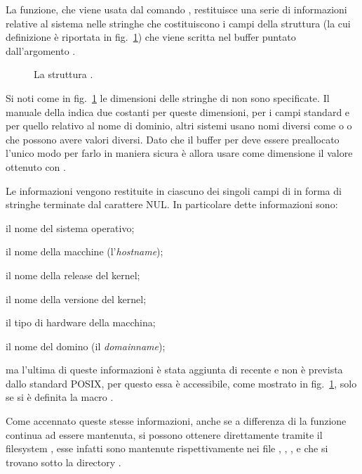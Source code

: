 La funzione, che viene usata dal comando , restituisce una serie di
informazioni relative al sistema nelle stringhe che costituiscono i campi
della struttura  (la cui definizione è riportata in
fig.~\ref{fig:sys_utsname}) che viene scritta nel buffer puntato
dall'argomento .

\begin{figure}[!ht!b]
  \footnotesize \centering
  \begin{minipage}[c]{0.85\textwidth}
  \end{minipage}
  \normalsize 
  \caption{La struttura .} 
  \label{fig:sys_utsname}
\end{figure}

Si noti come in fig.~\ref{fig:sys_utsname} le dimensioni delle stringhe di
 non sono specificate.  Il manuale della  indica
due costanti per queste dimensioni,  per i campi
standard e  per quello relativo al nome di
dominio, altri sistemi usano nomi diversi come  o
 o  che possono avere valori diversi. Dato
che il buffer per  deve essere preallocato l'unico modo per
farlo in maniera sicura è allora usare come dimensione il valore ottenuto con
.

Le informazioni vengono restituite in ciascuno dei singoli campi di
 in forma di stringhe terminate dal carattere NUL. In
particolare dette informazioni sono:
\begin{itemize*}
\item il nome del sistema operativo;
\item il nome della macchine (l'\textit{hostname});
\item il nome della release del kernel;
\item il nome della versione del kernel;
\item il tipo di hardware della macchina;
\item il nome del domino (il \textit{domainname});
\end{itemize*}
ma l'ultima di queste informazioni è stata aggiunta di recente e non è
prevista dallo standard POSIX, per questo essa è accessibile, come mostrato in
fig.~\ref{fig:sys_utsname}, solo se si è definita la macro
.

Come accennato queste stesse informazioni, anche se a differenza di
 la funzione continua ad essere mantenuta, si possono ottenere
direttamente tramite il filesystem , esse infatti sono mantenute
rispettivamente nei file ,
, ,
 e  che si
trovano sotto la directory .

